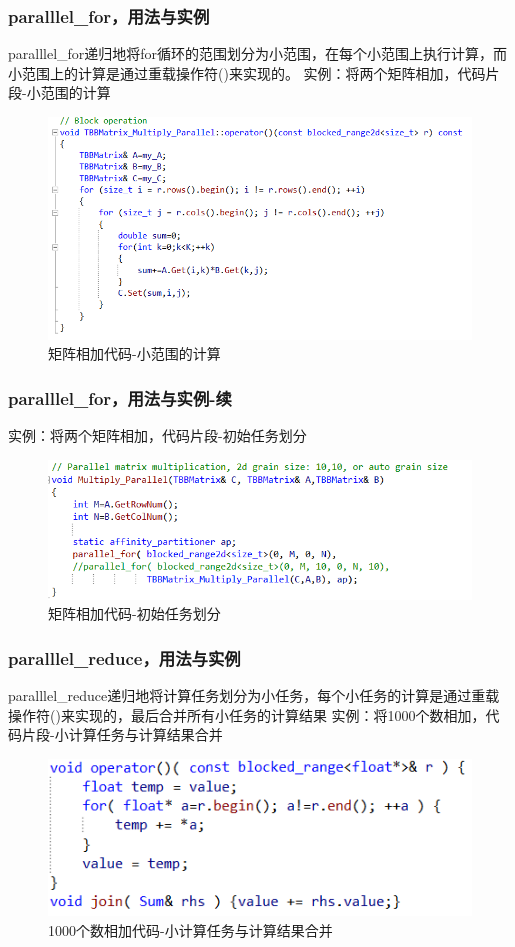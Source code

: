 \documentclass[hyperref={unicode},13pt,a4paper]{beamer}
\begin{document}
\begin{CJK*}{UTF8}{song}
\begin{frame}
	\frametitle{paralllel\_for，用法与实例}
    paralllel\_for递归地将for循环的范围划分为小范围，在每个小范围上执行计算，而小范围上的计算是通过重载操作符()来实现的。
    \newline
    实例：将两个矩阵相加，代码片段-小范围的计算
	\begin{figure}
	\centering
	\includegraphics[width=0.87\linewidth]{parallel_for_1}
	\caption[矩阵相加代码-小范围计算]{矩阵相加代码-小范围的计算} 
	\end{figure}    
\end{frame}

\begin{frame}
	\frametitle{paralllel\_for，用法与实例-续}
    实例：将两个矩阵相加，代码片段-初始任务划分
	\begin{figure}
	\centering
	\includegraphics[width=0.87\linewidth]{parallel_for_2}
	\caption[矩阵相加代码-初始任务划分]{矩阵相加代码-初始任务划分} 
	\end{figure}    
\end{frame}

\begin{frame}
	\frametitle{paralllel\_reduce，用法与实例}
    paralllel\_reduce递归地将计算任务划分为小任务，每个小任务的计算是通过重载操作符()来实现的，最后合并所有小任务的计算结果
    \newline
    实例：将1000个数相加，代码片段-小计算任务与计算结果合并
	\begin{figure}
	\centering
	\includegraphics[width=0.87\linewidth]{parallel_reduce_1}
	\caption[1000个数相加代码-小计算任务与计算结果合并]{1000个数相加代码-小计算任务与计算结果合并} 
	\end{figure}
\end{frame}


\end{CJK*}
\end{document}
